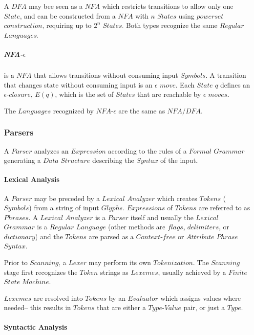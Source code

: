 \documentclass{article}
\begin{document}
    A $DFA$ may bee seen as a $NFA$ which restricts transitions to
    allow only one $State$, and can be constructed from a $NFA$ with
    $n$ $States$ using $powerset$ $construction$, requiring up to
    $2^n$ $States$. Both types recognize the same $Regular$
    $Languages$.

    \subparagraph{NFA-$\epsilon$} is a $NFA$ that allows transitions
    without consuming input $Symbols$. A transition that changes state
    without consuming input is an $\epsilon$ $move$. Each $State$ $q$
    defines an $\epsilon$-$closure$, $E(q)$, which is the set of
    $States$ that are reachable by $\epsilon$ $moves$.

    The $Languages$ recognized by $NFA$-$\epsilon$ are the same as
    $NFA$/$DFA$.

\subsubsection{Parsers}

    A $Parser$ analyzes an $Expression$ according to the rules of a
    $Formal$ $Grammar$ generating a $Data$ $Structure$ describing the
    $Syntax$ of the input.

    \paragraph{Lexical Analysis}
    A $Parser$ may be preceded by a $Lexical$ $Analyzer$ which creates
    $Tokens$ ($Symbols$) from a string of input
    $Glyphs$. $Expressions$ of $Tokens$ are referred to as
    $Phrases$. A $Lexical$ $Analyzer$ is a $Parser$ itself and usually
    the $Lexical$ $Grammar$ is a $Regular$ $Language$ (other methods
    are $flags$, $delimiters$, or $dictionary$) and the $Tokens$ are
    parsed as a $Context$-$free$ or $Attribute$ $Phrase$ $Syntax$.

    Prior to $Scanning$, a $Lexer$ may perform its own $Tokenization$.
    The $Scanning$ stage first recognizes the $Token$ strings as
    $Lexemes$, usually achieved by a $Finite$ $State$ $Machine$.

    $Lexemes$ are resolved into $Tokens$ by an $Evaluator$ which
    assigns values where needed-- this results in $Tokens$ that are
    either a $Type$-$Value$ pair, or just a $Type$.

    \paragraph{Syntactic Analysis}
\end{document}
